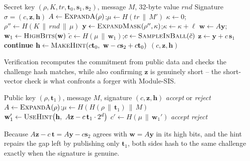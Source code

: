\begin{algorithm}[H]
\caption{ML-DSA.Sign (teaching form)}
\label{alg:mldsa-sign}
\begin{algorithmic}[1]
\Require Secret key $(\rho,K,tr,\mathbf{t}_0,\mathbf{s}_1,\mathbf{s}_2)$, message $M$, 32-byte value $rnd$
\Ensure Signature $\sigma=(c,\mathbf{z},\mathbf{h})$
\State $A \gets \textsc{ExpandA}(\rho)$;\quad $\mu \gets H(tr\,\|\,M')$
\State $\kappa \gets 0$;\quad $\rho'' \gets H(K\,\|\,rnd\,\|\,\mu)$ 
\Loop
  \State $\mathbf{y} \gets \textsc{ExpandMask}(\rho'', \kappa)$;\quad $\kappa \gets \kappa+\ell$ 
  \State $\mathbf{w} \gets A\mathbf{y}$;\quad $\mathbf{w}_1 \gets \textsc{HighBits}(\mathbf{w})$
  \State $\tilde c \gets H(\mu\,\|\,\mathbf{w}_1)$;\quad $c\gets\textsc{SampleInBall}(\tilde c)$
  \State $\mathbf{z} \gets \mathbf{y} + c\,\mathbf{s}_1$
    \State \textbf{continue} 
  \EndIf
  \State $\mathbf{h} \gets \textsc{MakeHint}(c\mathbf{t}_0,\ \mathbf{w}-c\mathbf{s}_2+c\mathbf{t}_0)$
  \State \Return $(c,\mathbf{z},\mathbf{h})$
\EndLoop
\end{algorithmic}
\end{algorithm}

Verification recomputes the commitment from public data and checks the challenge hash matches, while also confirming $\mathbf{z}$ is genuinely short -- the short-vector check is what confronts a forger with Module-SIS.

\begin{algorithm}[H]
\caption{ML-DSA.Verify (teaching form)}
\label{alg:mldsa-verify}
\begin{algorithmic}[1]
\Require Public key $(\rho,\mathbf{t}_1)$, message $M$, signature $(c,\mathbf{z},\mathbf{h})$
\Ensure \emph{accept} or \emph{reject}
\State $A \gets \textsc{ExpandA}(\rho)$;\quad $\mu \gets H(H(\rho\,\|\,\mathbf{t}_1)\,\|\,M)$
\State $\mathbf{w}_1' \gets \textsc{UseHint}\big(\mathbf{h},\ A\mathbf{z} - c\,\mathbf{t}_1\cdot 2^d\big)$
\State $c' \gets H(\mu\,\|\,\mathbf{w}_1')$
  \State \Return \emph{accept}
\Else
  \State \Return \emph{reject}
\EndIf
\end{algorithmic}
\end{algorithm}

Because $A\mathbf{z} - c\,\mathbf{t} = A\mathbf{y} - c\mathbf{s}_2$ agrees with $\mathbf{w}=A\mathbf{y}$ in its high bits, and the hint repairs the gap left by publishing only $\mathbf{t}_1$, both sides hash to the same challenge exactly when the signature is genuine.

